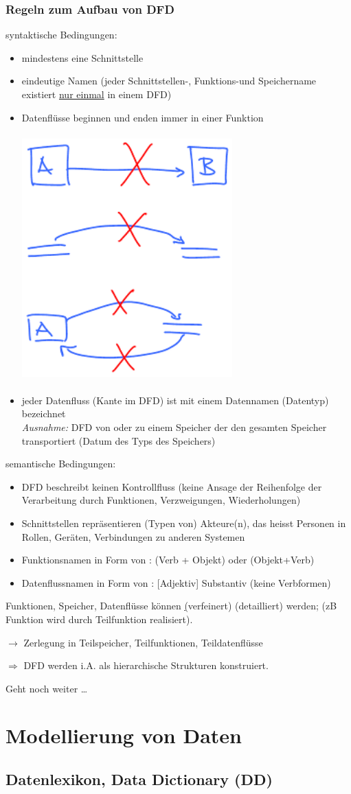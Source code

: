 \documentclass[10pt,a4paper]{book}
\begin{document}
\subsubsection*{Regeln zum Aufbau von DFD}
syntaktische Bedingungen:
\begin{itemize}
  \item mindestens eine Schnittstelle
  \item eindeutige Namen (jeder Schnittstellen-, Funktions-und Speichername existiert  \underline{nur einmal} in einem DFD) 
  \item Datenflüsse beginnen und enden immer in einer Funktion
  
   \includegraphics[scale=1,width=230pt,height=270pt]{src/pictures/3_2_1__07.png}
  \item jeder Datenfluss (Kante im DFD) ist mit einem Datennamen (Datentyp) bezeichnet\\  \emph{Ausnahme:} DFD von oder zu einem Speicher der den gesamten Speicher transportiert (Datum des Typs des Speichers)
\end{itemize}
semantische Bedingungen:
\begin{itemize}
  \item DFD beschreibt keinen Kontrollfluss (keine Ansage der Reihenfolge der Verarbeitung durch Funktionen, Verzweigungen, Wiederholungen) 
  \item Schnittstellen repräsentieren (Typen von) Akteure(n), das heisst Personen in Rollen, Geräten, Verbindungen zu anderen Systemen 
  \item Funktionsnamen in Form von : (Verb + Objekt) oder (Objekt+Verb)
  \item Datenflussnamen in Form von : [Adjektiv] Substantiv (keine Verbformen) 
\end{itemize}
Funktionen, Speicher, Datenflüsse können \underline(verfeinert) (detailliert) werden; (zB Funktion wird durch Teilfunktion realisiert). 

$\rightarrow$ Zerlegung in Teilspeicher, Teilfunktionen, Teildatenflüsse

$\Rightarrow$ DFD werden i.A. als hierarchische Strukturen konstruiert.

Geht noch weiter \ldots
\section{Modellierung von Daten}
\subsection{Datenlexikon, Data Dictionary (DD)}
\end{document}
